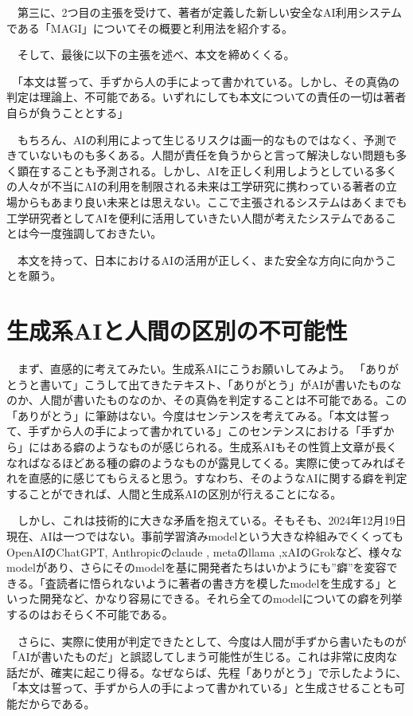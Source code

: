 \documentclass{article}
\begin{document}
　第三に、2つ目の主張を受けて、著者が定義した新しい安全なAI利用システムである「MAGI」についてその概要と利用法を紹介する。
    
　そして、最後に以下の主張を述べ、本文を締めくくる。
    
　「本文は誓って、手ずから人の手によって書かれている。しかし、その真偽の判定は理論上、不可能である。いずれにしても本文についての責任の一切は著者自らが負うこととする」

　もちろん、AIの利用によって生じるリスクは画一的なものではなく、予測できていないものも多くある\cite{cstp_ai_strategy}。人間が責任を負うからと言って解決しない問題も多く顕在することも予測される。しかし、AIを正しく利用しようとしている多くの人々が不当にAIの利用を制限される未来は工学研究に携わっている著者の立場からもあまり良い未来とは思えない。ここで主張されるシステムはあくまでも工学研究者としてAIを便利に活用していきたい人間が考えたシステムであることは今一度強調しておきたい。

　本文を持って、日本におけるAIの活用が正しく、また安全な方向に向かうことを願う。


\section{生成系AIと人間の区別の不可能性}

　まず、直感的に考えてみたい。生成系AIにこうお願いしてみよう。 「ありがとうと書いて」こうして出てきたテキスト、「ありがとう」がAIが書いたものなのか、人間が書いたものなのか、その真偽を判定することは不可能である。この「ありがとう」に筆跡はない。今度はセンテンスを考えてみる。「本文は誓って、手ずから人の手によって書かれている」このセンテンスにおける「手ずから」にはある癖のようなものが感じられる。生成系AIもその性質上文章が長くなればなるほどある種の癖のようなものが露見してくる。実際に使ってみればそれを直感的に感じてもらえると思う。すなわち、そのようなAIに関する癖を判定することができれば、人間と生成系AIの区別が行えることになる。

　しかし、これは技術的に大きな矛盾を抱えている。そもそも、2024年12月19日現在、AIは一つではない。事前学習済みmodelという大きな枠組みでくくってもOpenAIのChatGPT\cite{openai_chatgpt}, Anthropicのclaude\cite{claude_ai} , metaのllama\cite{llama} ,xAIのGrok\cite{x_ai}など、様々なmodelがあり、さらにそのmodelを基に開発者たちはいかようにも”癖”を変容できる。「査読者に悟られないように著者の書き方を模したmodelを生成する」といった開発など、かなり容易にできる。それら全てのmodelについての癖を列挙するのはおそらく不可能である。

　さらに、実際に使用が判定できたとして、今度は人間が手ずから書いたものが「AIが書いたものだ」と誤認してしまう可能性が生じる。これは非常に皮肉な話だが、確実に起こり得る。なぜならば、先程「ありがとう」で示したように、「本文は誓って、手ずから人の手によって書かれている」と生成させることも可能だからである。
\end{document}
